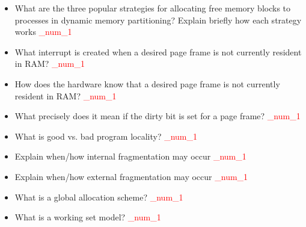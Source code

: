 \documentclass[9pt,landscape]{memoir}
\newcommand{\answer}[1]{\textcolor{red}{_num_1}}
\begin{document}
\begin{multicols}{6}
\begin{itemize}
    \item What are the three popular strategies for allocating free memory blocks to processes in dynamic memory partitioning? Explain briefly how each strategy works \answer{First-fit: chooses the first free block in the list that is large enough for the request; Best-fit: chooses the free block that is closest in size to the request; Next-fit: chooses the first free block that is large enough for the request and comes after the `Last Allocated Block' in the list}
    \item What interrupt is created when a desired page frame is not currently resident in RAM?  \answer{Page fault trap}
    \item How does the hardware know that a desired page frame is not currently resident in RAM?  \answer{Valid bit}
    \item What precisely does it mean if the dirty bit is set for a page frame?  \answer{The page frame has been modified}
    \item What is good vs. bad program locality?  \answer{Good locality means that the process executes in clustered pages. Bad locality means that the process executes in scattered pages}
    \item Explain when/how internal fragmentation may occur \answer{When fixed-sized pages are used, the last page of a program may be partially filled. This is called internal fragmentation}
    \item Explain when/how external fragmentation may occur \answer{Segmentation system breaks up the memory space into variable-sized pieces. After a sequence of allocation and deallocations, free memory may get fragmented into small pieces. Even if the total size of free memory is large enough to satisfy large memory requests, a large request may not be met due to the lack of continuity between small fragments. This is called external fragmentation. Compaction is needed to put free blocks into one large memory block}
    \item What is a global allocation scheme?  \answer{Global replacement allows a process to select a replacement frame from the set of all frames, even if that frame is currently allocated to some other process; one process can take a frame from another}
    \item What is a working set model?  \answer{The working set model assumes that processes execute in localities. The working set is the set of pages in the current locality. Accordingly, each process should be allocated enough frames for its current working set}

\end{itemize}
\end{multicols}
\end{document}

